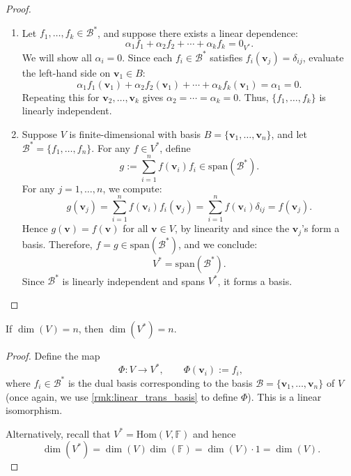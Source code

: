 \begin{proof}
\begin{enumerate}
  \item Let \( f_1, \ldots, f_k \in \mathcal{B}^* \), and suppose there exists a linear dependence:
  \[
  \alpha_1 f_1 + \alpha_2 f_2 + \cdots + \alpha_k f_k = 0_{V^*}.
  \]
  We will show all \( \alpha_i = 0 \). Since each \( f_i \in \mathcal{B}^* \) satisfies \( f_i(\mathbf{v}_j) = \delta_{ij} \), evaluate the left-hand side on \( \mathbf{v}_1 \in B \):
  \[
  \alpha_1 f_1(\mathbf{v}_1) + \alpha_2 f_2(\mathbf{v}_1) + \cdots + \alpha_k f_k(\mathbf{v}_1) = \alpha_1 = 0.
  \]
  Repeating this for \( \mathbf{v}_2, \ldots, \mathbf{v}_k \) gives \( \alpha_2 = \cdots = \alpha_k = 0 \). Thus, \( \{ f_1, \ldots, f_k \} \) is linearly independent.

  \item Suppose \( V \) is finite-dimensional with basis \( B = \{ \mathbf{v}_1, \ldots, \mathbf{v}_n \} \), and let \( \mathcal{B}^* = \{ f_1, \ldots, f_n \} \). For any \( f \in V^* \), define
  \[
  g := \sum_{i=1}^n f(\mathbf{v}_i) f_i \in \mathrm{span}(\mathcal{B}^*).
  \]
  For any \( j = 1, \ldots, n \), we compute:
  \[
  g(\mathbf{v}_j) = \sum_{i=1}^n f(\mathbf{v}_i) f_i(\mathbf{v}_j) = \sum_{i=1}^n f(\mathbf{v}_i) \delta_{ij} = f(\mathbf{v}_j).
  \]
  Hence \( g(\mathbf{v}) = f(\mathbf{v}) \) for all \( \mathbf{v} \in V \), by linearity and since the \( \mathbf{v}_j \)'s form a basis. Therefore, \( f = g \in \mathrm{span}(\mathcal{B}^*) \), and we conclude:
  \[
  V^* = \mathrm{span}(\mathcal{B}^*).
  \]
  Since \( \mathcal{B}^* \) is linearly independent and spans \( V^* \), it forms a basis.
\end{enumerate}
\end{proof}

\begin{corollary}\label{cor: dual-dim-equality}
If \( \dim(V) = n \), then \( \dim(V^*) = n \).
\end{corollary}

\begin{proof}
Define the map
\[
\Phi: V \longrightarrow V^*, \qquad \Phi(\mathbf{v}_i) := f_i,
\]
where \( f_i \in \mathcal{B}^* \) is the dual basis corresponding to the basis \( \mathcal{B} = \{ \mathbf{v}_1, \dots, \mathbf{v}_n \} \) of \( V \) (once again, we use \autoref{rmk:linear_trans_basis} to define $\Phi$). This is a linear isomorphism.

Alternatively, recall that $V^* = \mathrm{Hom}(V,\mathbb{F})$ and hence
$$\dim(V^*) = \dim(V)\dim(\mathbb{F}) = \dim(V) \cdot 1 = \dim(V).$$
\end{proof}

